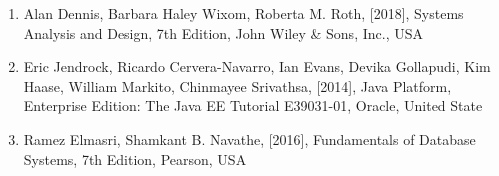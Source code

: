 

\begin{enumerate}
\item Alan Dennis, Barbara Haley Wixom, Roberta M. Roth, [2018], Systems Analysis and Design, 7th Edition, John Wiley & Sons, Inc., USA\cite{yonatan2018managing}
\item Eric Jendrock, Ricardo Cervera-Navarro, Ian Evans, Devika Gollapudi, Kim Haase, William Markito, Chinmayee Srivathsa, [2014], Java Platform, Enterprise Edition: The Java EE Tutorial E39031-01, Oracle, United State\cite{elmasri2000fundamentals}
\item Ramez Elmasri, Shamkant B. Navathe, [2016], Fundamentals of Database Systems, 7th Edition, Pearson, USA
\end{enumerate}\cite{xkcd}

